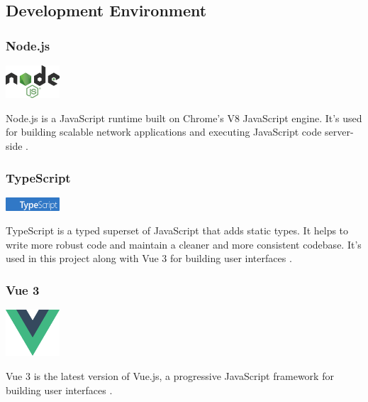 \subsection{Development Environment}

\subsubsection*{Node.js}
\begin{center}
\includegraphics[width=0.15\textwidth]{Images/logos/node.png}
\label{fig:nodejs}
\end{center}
Node.js is a JavaScript runtime built on Chrome’s V8 JavaScript engine. It’s used for building scalable network applications and executing JavaScript code server-side \cite{node}.

\subsubsection*{TypeScript}
\begin{center}
\includegraphics[width=0.15\textwidth]{Images/logos/ts-lettermark-blue.png}
\label{fig:typescript}
\end{center}
TypeScript is a typed superset of JavaScript that adds static types. It helps to write more robust code and maintain a cleaner and more consistent codebase. It’s used in this project along with Vue 3 for building user interfaces \cite{typescript}.

\subsubsection*{Vue 3}
\begin{center}
\includegraphics[width=0.15\textwidth]{Images/logos/vue.png}
\label{fig:vue3}
\end{center}
Vue 3 is the latest version of Vue.js, a progressive JavaScript framework for building user interfaces \cite{vue3}.

